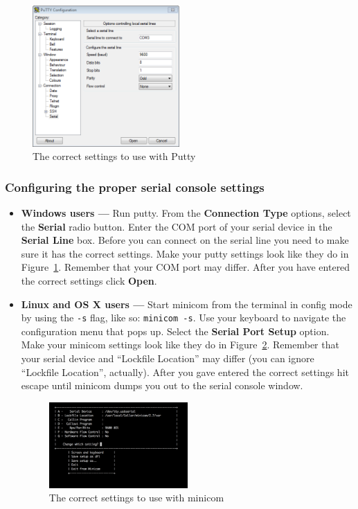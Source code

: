 \documentclass[notitlepage]{article}
\begin{document}
\begin{figure}[ht!]
  \centering
  \includegraphics[width=0.5\textwidth]{fig0.png}
  \caption{The correct settings to use with Putty}
  \label{fig:putty}
\end{figure}

\subsubsection{Configuring the proper serial console settings}
\begin{itemize}
\item \textbf{Windows users --- }
  Run putty. From the \textbf{Connection Type} options, select the \textbf{Serial} radio button. Enter the COM port of your serial device in the \textbf{Serial Line} box. Before you can connect on the serial line you need to make sure it has the correct settings. Make your putty settings look like they do in Figure~\ref{fig:putty}. Remember that your COM port may differ. After you have entered the correct settings click \textbf{Open}.

\item \textbf{Linux and OS X users --- } Start minicom from the terminal in config mode by using the \texttt{-s} flag, like so: \texttt{minicom -s}. Use your keyboard to navigate the configuration menu that pops up. Select the \textbf{Serial Port Setup} option. Make your minicom settings look like they do in Figure~\ref{fig:minicom}. Remember that your serial device and ``Lockfile Location'' may differ (you can ignore ``Lockfile Location'', actually). After you gave entered the correct settings hit escape until minicom dumps you out to the serial console window.

\begin{figure}[ht!]
  \centering
  \includegraphics[width=0.5\textwidth]{fig1.png}
  \caption{The correct settings to use with minicom}
  \label{fig:minicom}
\end{figure}
\end{itemize}
\end{document}
